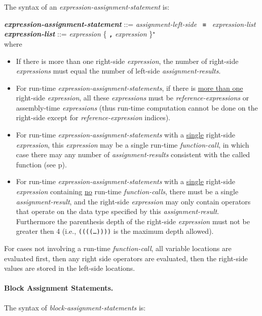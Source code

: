 \documentclass[12pt]{article}
\newcommand{\subsubsubsection}[1]{\paragraph[#1]{#1.}}
\newcommand{\TT}[1]{{\tt \bfseries #1}}
\newcommand{\STAR}{{\Large $^\star$}}
\newcommand{\emkey}[1]{{\em \bfseries #1}}
\newcommand{\pagref}[1]{p\pageref{#1}}
\newenvironment{indpar}[1][0.3in]%
	{\begin{list}{}%
		     {\setlength{\itemsep}{0in}%
		      \setlength{\topsep}{0in}%
		      \setlength{\parsep}{1ex}%
		      \setlength{\labelwidth}{#1}%
		      \setlength{\leftmargin}{#1}%
		      \addtolength{\leftmargin}{\labelsep}}%
	 \item}%
	{\end{list}}
\begin{document}
The syntax of an {\em expression-assign\-ment-statement} is:
\begin{indpar}
\emkey{expression-assignment-statement} ::=
    {\em assignment-left-side} ~\TT{=}~ {\em expression-list}
\\[0.5ex]
\emkey{expression-list}\label{EXPRESSION-LIST} ::=
	      {\em expression} \{ \TT{,} {\em expression} \}\STAR{}
\\[2.0ex]
where
\begin{itemize}
\item If there is more than one right-side {\em expression},
the number of right-side {\em expressions} must equal the number
of left-side {\em assignment-results}.
\item For run-time {\em expression-assignment-statements}, if
there is \underline{more than one} right-side {\em expression}, all these
{\em expressions} must be {\em reference-expressions} or
assembly-time {\em expressions} (thus run-time computation cannot
be done on the right-side except for {\em reference-expression}
indices).
\item For run-time {\em expression-assignment-statements} with
a \underline{single} right-side {\em expression}, this {\em expression}
may be a single run-time {\em function-call},
in which case there may any number of {\em assignment-results}
consistent with the called function (see \pagref{FUNCTION-CALLS}).
\item For run-time {\em expression-assignment-statements} with
a \underline{single} right-side {\em expression} containing
\underline{no} run-time {\em function-calls}, 
there must be a single {\em assignment-result}, and the right-side
{\em expression} may only contain operators that operate on
the data type specified by this {\em assignment-result}.
Furthermore the parenthesis depth of the right-side {\em expression}
must not be greater then 4 (i.e., {\tt ((((\ldots))))} is the
maximum depth allowed).
\end{itemize}
\end{indpar}

For cases not involving a run-time {\em function-call},
all variable locations are evaluated first, then any right
side operators are evaluated, then the right-side values are stored
in the left-side locations.


\subsubsubsection{Block Assignment Statements}
\label{BLOCK-ASSIGNMENT-STATEMENTS}

The syntax of {\em block-assignment-statements} is:
\end{document}
